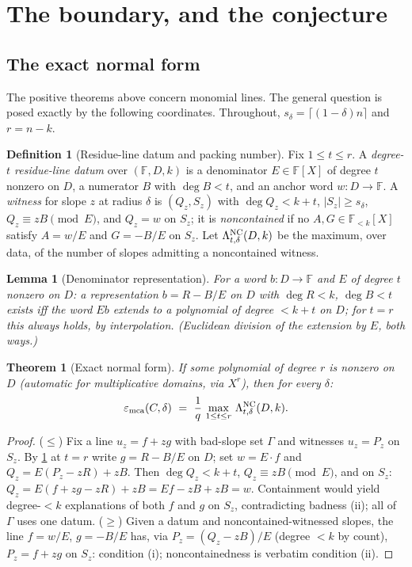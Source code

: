 \documentclass[11pt]{article}
\newtheorem{theorem}{Theorem}[section]
\newtheorem{lemma}[lemma]{Lemma}
\theoremstyle{definition}
\newtheorem{definition}[definition]{Definition}
\newcommand{\F}{\mathbb F}
\newcommand{\eps}{\varepsilon}
\newcommand{\emca}{\eps_{\rm mca}}
\begin{document}
\section{The boundary, and the conjecture}\label{sec:boundary}

\subsection{The exact normal form}

The positive theorems above concern monomial lines.  The general question is posed exactly by the following coordinates.  Throughout, $s_\delta=\lceil(1-\delta)n\rceil$ and $r=n-k$.

\begin{definition}[Residue-line datum and packing number]\label{def:residue}
Fix $1\le t\le r$.  A \emph{degree-$t$ residue-line datum} over $(\F,D,k)$ is a denominator $E\in\F[X]$ of degree $t$ nonzero on $D$, a numerator $B$ with $\deg B<t$, and an anchor word $w:D\to\F$.  A \emph{witness} for slope $z$ at radius $\delta$ is $(Q_z,S_z)$ with $\deg Q_z<k+t$, $|S_z|\ge s_\delta$, $Q_z\equiv zB\pmod E$, and $Q_z=w$ on $S_z$; it is \emph{noncontained} if no $A,G\in\F_{<k}[X]$ satisfy $A=w/E$ and $G=-B/E$ on $S_z$.  Let $\Lambda^{\rm NC}_{t,\delta}(D,k)$ be the maximum, over data, of the number of slopes admitting a noncontained witness.
\end{definition}

\begin{lemma}[Denominator representation]\label{lem:denom}
For a word $b:D\to\F$ and $E$ of degree $t$ nonzero on $D$: a representation $b=R-B/E$ on $D$ with $\deg R<k$, $\deg B<t$ exists iff the word $Eb$ extends to a polynomial of degree $<k+t$ on $D$; for $t=r$ this always holds, by interpolation.  (Euclidean division of the extension by $E$, both ways.)
\end{lemma}

\begin{theorem}[Exact normal form]\label{thm:normalform}
If some polynomial of degree $r$ is nonzero on $D$ (automatic for multiplicative domains, via $X^r$), then for every $\delta$:
\[
        \emca(C,\delta)\ =\ \frac1q\,\max_{1\le t\le r}\,\Lambda^{\rm NC}_{t,\delta}(D,k) .
\]
\end{theorem}

\begin{proof}
($\le$)  Fix a line $u_z=f+zg$ with bad-slope set $\Gamma$ and witnesses $u_z=P_z$ on $S_z$.  By \cref{lem:denom} at $t=r$ write $g=R-B/E$ on $D$; set $w=E\cdot f$ and $Q_z=E(P_z-zR)+zB$.  Then $\deg Q_z<k+t$, $Q_z\equiv zB\pmod E$, and on $S_z$: $Q_z=E(f+zg-zR)+zB=Ef-zB+zB=w$.  Containment would yield degree-$<k$ explanations of both $f$ and $g$ on $S_z$, contradicting badness (ii); all of $\Gamma$ uses one datum.
($\ge$)  Given a datum and noncontained-witnessed slopes, the line $f=w/E$, $g=-B/E$ has, via $P_z=(Q_z-zB)/E$ (degree $<k$ by count), $P_z=f+zg$ on $S_z$: condition (i); noncontainedness is verbatim condition (ii).
\end{proof}
\end{document}
